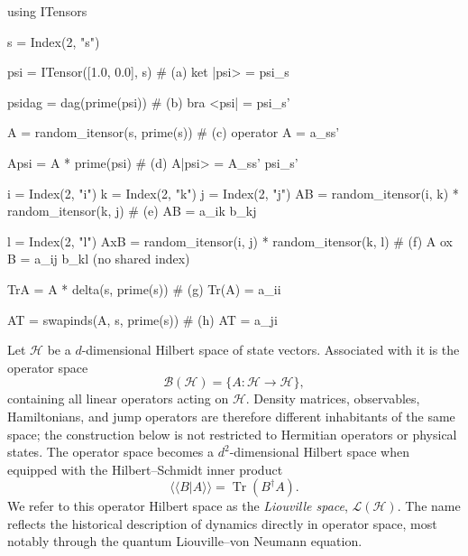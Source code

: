 %
\begin{juliacode}[
  caption={ITensor codes to realise tensor operations in Fig.~\ref{fig:graphical-dictionary}(a)--(h).},
  label={lst:itensor-grammar},
]
using ITensors

s = Index(2, "s")

psi = ITensor([1.0, 0.0], s) # (a) ket |psi> = psi_s

psidag = dag(prime(psi)) # (b) bra <psi| = psi_s'

A = random_itensor(s, prime(s)) # (c) operator A = a_ss'

Apsi = A * prime(psi) # (d) A|psi> = A_ss' psi_s'

i = Index(2, "i")
k = Index(2, "k")
j = Index(2, "j")
AB = random_itensor(i, k) * random_itensor(k, j) # (e) AB = a_ik b_kj

l = Index(2, "l")
AxB = random_itensor(i, j) * random_itensor(k, l) # (f) A ox B = a_ij b_kl  (no shared index)

TrA = A * delta(s, prime(s)) # (g) Tr(A) = a_ii

AT = swapinds(A, s, prime(s)) # (h) AT = a_ji
\end{juliacode}
%

\label{subsec:liouville-vectorisation}

Let \(\mathcal H\) be a \(d\)-dimensional Hilbert space of state vectors.
Associated with it is the operator space
%
\begin{equation}
    \mathcal B(\mathcal H)
    = \{A:\mathcal H\rightarrow\mathcal H\},
\end{equation}
%
containing all linear operators acting on \(\mathcal H\).
Density matrices, observables, Hamiltonians, and jump operators are therefore different inhabitants of the same space; the construction below is not restricted to Hermitian operators or physical states.
The operator space becomes a \(d^2\)-dimensional Hilbert space when equipped with the Hilbert--Schmidt inner product
%
\begin{equation}
    \langle\!\langle B\vert A\rangle\!\rangle
    = \operatorname{Tr}(B^\dagger A).
    \label{eq:hilbert-schmidt-inner-product}
\end{equation}
%
We refer to this operator Hilbert space as the \emph{Liouville space}, \(\mathcal L(\mathcal H)\).
The name reflects the historical description of dynamics directly in operator space, most notably through the quantum Liouville--von Neumann equation.

